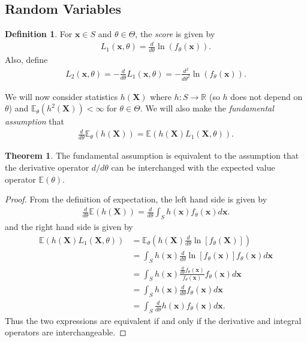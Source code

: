 \documentclass[a4paper,12pt]{article}
\theoremstyle{definition}
\newtheorem{theorem}{Theorem}[section]
\theoremstyle{definition}
\theoremstyle{definition}
\newtheorem{definition}{Definition}[section]
\newcommand{\bs}{\boldsymbol}
\begin{document}
    \subsection*{Random Variables}
    \begin{definition}
        For $\bs{x} \in S$ and $\theta \in \Theta$, the \textit{score} is given by
        \begin{align*}
            L_1(\bs{x}, \theta) = \frac{d}{d\theta} \ln (f_\theta(\bs{x})).
        \end{align*}
        Also, define
        \begin{align*}
            L_2(\bs{x}, \theta) = -\frac{d}{d\theta} L_1(\bs{x}, \theta) = -\frac{d^2}{d\theta^2} \ln(f_\theta(\bs{x})).
        \end{align*}
    \end{definition}
    We will now consider statistics $h(\bs{X})$ where $h : S \to \mathbb{R}$ (so $h$ does not depend on $\theta$) and $\mathbb{E}_\theta \left( h^2(\bs{X}) \right) < \infty$ for $\theta \in \Theta$. We will also make the \textit{fundamental assumption} that
    \begin{align}
        \frac{d}{d\theta} \mathbb{E}_\theta(h(\bs{X})) = \mathbb{E}(h(\bs{X}) L_1(\bs{X}, \theta)).
    \end{align}
    \begin{theorem}
        The fundamental assumption is equivalent to the assumption that the derivative operator $d/d\theta$ can be interchanged with the expected value operator $\mathbb{E}(\theta)$.
        \begin{proof}
            From the definition of expectation, the left hand side is given by
            \begin{align*}
                \frac{d}{d\theta} \mathbb{E}(h(\bs{X})) = \frac{d}{d\theta} \int_S h(\bs{x}) f_\theta(\bs{x}) d\bs{x}.
            \end{align*}
            and the right hand side is given by
            \begin{align*}
                \mathbb{E}(h(\bs{X}) L_1(\bs{X}, \theta)) &= \mathbb{E}_\theta \left( h(\bs{X}) \frac{d}{d\theta} \ln[f_\theta(\bs{X})] \right) \\
                &= \int_S h(\bs{x}) \frac{d}{d\theta} \ln[f_\theta(\bs{x})] f_\theta(\bs{x}) d\bs{x} \\
                &= \int_S h(\bs{x}) \frac{\frac{d}{d\theta} f_\theta(\bs{x})}{f_\theta(\bs{x})} f_\theta(\bs{x}) d\bs{x} \\
                &= \int_S h(\bs{x}) \frac{d}{d\theta} f_\theta(\bs{x}) d\bs{x} \\
                &= \int_S \frac{d}{d\theta} h(\bs{x}) f_\theta(\bs{x}) d\bs{x}.
            \end{align*}
            Thus the two expressions are equivalent if and only if the derivative and integral operators are interchangeable.
        \end{proof}
    \end{theorem}
\end{document}
